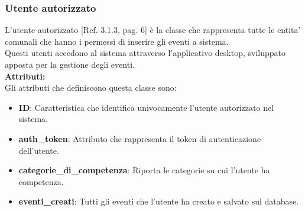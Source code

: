 \documentclass{article}
\begin{document}
\subsubsection{Utente autorizzato}

L'utente autorizzato [Ref. 3.1.3, pag. 6] è la classe che rappresenta tutte le entita' comunali che hanno i permessi di inserire gli eventi a sistema.\\
Questi utenti accedono al sistema attraverso l'applicativo desktop, sviluppato apposta per la gestione degli eventi.\\

\textbf{Attributi:}\\
Gli attributi che definiscono questa classe sono:
\begin{itemize}
    \item \textbf{ID}: Caratteristica che identifica univocamente l'utente autorizzato nel sistema.
    \item \textbf{auth\_token}: Attributo che rappresenta il token di autenticazione dell'utente.
    \item \textbf{categorie\_di\_competenza}: Riporta le categorie su cui l'utente ha competenza.
    \item \textbf{eventi\_creati}: Tutti gli eventi che l'utente ha creato e salvato sul database.
\end{itemize}
\end{document}
